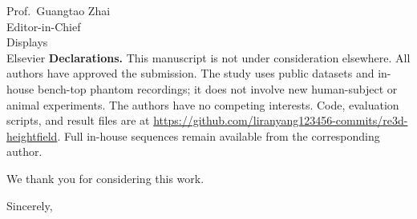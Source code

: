 \documentclass[12pt]{letter}
\begin{document}
\begin{letter}{Prof.\ Guangtao Zhai\\
Editor-in-Chief\\
Displays\\
Elsevier}
\textbf{Declarations.}
This manuscript is not under consideration elsewhere. All authors have approved the submission. The study uses public datasets and in-house bench-top phantom recordings; it does not involve new human-subject or animal experiments. The authors have no competing interests. Code, evaluation scripts, and result files are at \url{https://github.com/liranyang123456-commits/re3d-heightfield}. Full in-house sequences remain available from the corresponding author.

We thank you for considering this work.

\closing{Sincerely,}

\end{letter}
\end{document}
